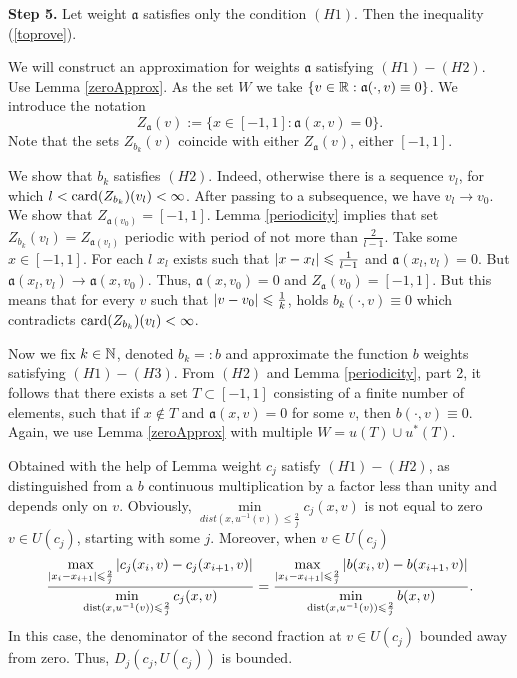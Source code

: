 \bigskip
{\bf Step 5.} Let weight $\mathfrak a$ satisfies only the condition $(H1)$.
Then the inequality (\ref{toprove}).

We will construct an approximation for weights $\mathfrak a$ satisfying $(H1)-(H2)$.
Use Lemma \ref{zeroApprox}.
As the set $W$ we take $\{ v \in \mathbb R: \mathfrak a(\cdot, v) \equiv 0 \}$.
We introduce the notation $$Z_{\mathfrak a}(v) := \{ x \in [-1, 1]: \mathfrak a(x, v) = 0 \}.$$
Note that the sets $Z_{b_k}(v)$ coincide with either $Z_{\mathfrak a}(v)$, either $[-1, 1]$.

We show that $b_k$ satisfies $(H2)$.
Indeed, otherwise there is a sequence $v_l$, for which
$l < {\rm card}(Z_{b_k})(v_l) < \infty$.
After passing to a subsequence, we have $v_l \to v_0$.
We show that $Z_{\mathfrak a(v_0)} = [-1, 1]$. Lemma \ref{periodicity} implies that
set $Z_{b_k}(v_l) = Z_{\mathfrak a(v_l)}$ periodic with period of not more than $\frac{2}{l - 1}$.
Take some $x \in [-1, 1]$. For each $l$ $x_l$ exists such that
$\abs{x - x_l} \le \frac{1}{l - 1}$ and $\mathfrak a(x_l, v_l) = 0$.
But $\mathfrak a(x_l, v_l) \to \mathfrak a(x, v_0)$.
Thus, $\mathfrak a(x, v_0) = 0$ and $Z_{\mathfrak a}(v_0) = [-1, 1]$.
But this means that for every $v$ such
that $\abs{v - v_0} \le \frac{1}{k}$, holds $b_k(\cdot, v) \equiv 0$
which contradicts ${\rm card}(Z_{b_k})(v_l) < \infty$.


Now we fix $k \in \mathbb N$, denoted $b_k =: b$
and approximate the function $b$ weights satisfying $(H1)-(H3)$.
From $(H2)$ and Lemma \ref{periodicity}, part 2, it follows that there exists a set $T \subset [-1, 1]$
consisting of a finite number of elements, such that
if $x \not \in T$ and $\mathfrak a(x, v) = 0$ for some $v$, then $b(\cdot, v) \equiv 0$.
Again, we use Lemma \ref{zeroApprox} with multiple
$W = u(T) \cup u^*(T)$.

Obtained with the help of Lemma weight $c_j$ satisfy $(H1)-(H2)$, as distinguished from a $b$
continuous multiplication by a factor less than unity and depends only on $v$.
Obviously, $\min\limits_{dist(x, u^{-1}(v)) \le \frac{2}{j}} c_j(x, v)$ is not equal to zero
$v \in U(c_j)$, starting with some $j$.
Moreover, when $v \in U(c_j)$
$$
\frac{\max\limits_{\abs{x_i - x_{i + 1}} \le \frac{2}{j}} \abs{c_j(x_i, v) - c_j(x_{i + 1}, v)}}
{\min\limits_{\dist(x, u^{-1}(v)) \le \frac{2}{j}} c_j(x, v)}
=\frac{\max\limits_{\abs{x_i - x_{i + 1}} \le \frac{2}{j}} \abs{b(x_i, v) - b(x_{i + 1}, v)}}
{\min\limits_{\dist(x, u^{-1}(v)) \le \frac{2}{j}} b(x, v)}.
$$
In this case, the denominator of the second fraction at $v \in U(c_j)$ bounded away from zero.
Thus, $D_j(c_j, U(c_j))$ is bounded.

